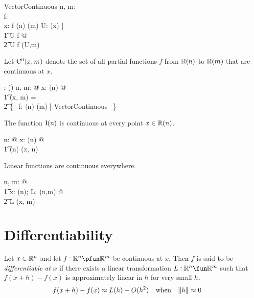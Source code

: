 \documentclass[11pt, oneside]{article}
\begin{document}
\begin{schema}{VectorContinuous}
	n, m: \nat \\
	f: \Rinf \pfun \Rinf \\
	x: \Rinf
\where
	f \in \Rtuples(n) \pfun \Rtuples(m)
\also
	\exists U: \neighRn(x) | \\
	\t1	U \subseteq \dom f @ \\
	\t2		U \dres f \in \CzeroPRnN(U,m)
\end{schema}

Let $\operatorname{C^0}(x,m)$ denote the set of all partial functions $f$ from $\mathbb{R}(n)$ to $\mathbb{R}(m)$
that are continuous at $x$.

\begin{axdef}
	\CzeroRnN: \Rinf \cross \nat \fun \power (\Rinf \pfun \Rinf)
\where
	\forall n, m: \nat @ \forall x: \Rtuples(n)  @ \\
	\t1	\CzeroRnN(x, m) = \\
	\t2		\{~ f: \Rtuples(n) \pfun \Rtuples(m) | VectorContinuous ~\}
\end{axdef}

\begin{example}
The function $\operatorname{I}(n)$ is continuous at every point $x \in \mathbb{R}(n)$.

\begin{zed}
	\forall n: \nat @ \forall x: \Rtuples(n) @ \\
	\t1	\In(n) \in \CzeroRnN(x, n)
\end{zed}

\end{example}

\begin{theorem}
Linear functions are continuous everywhere.

\begin{zed}
	\forall n, m: \nat @ \\
	\t1	\forall x: \Rtuples(n); L: \linR(n,m) @ \\
	\t2		L \in \CzeroRnN(x, m)
\end{zed}

\end{theorem}


\section{Differentiability}

Let $x \in \mathbb{R}^n$ and let $f: \R^n \pfun \R^m$ be continuous at $x$.
Then $f$ is said to be {\it differentiable at $x$} if there exists a linear transformation $L: \R^n \fun \R^m$
such that $f(x + h) - f(x)$ is approximately linear in $h$ for very small $h$.
$$
f(x + h) - f(x) \approx  L(h) + O(h^2) \quad \text{when} \quad \norm{h} \approx 0
$$
\end{document}
